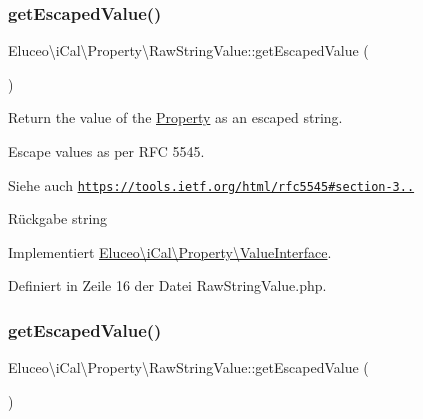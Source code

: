 \subsubsection{\texorpdfstring{get\+Escaped\+Value()}{getEscapedValue()}\hspace{0.1cm}{\footnotesize\ttfamily [2/3]}}
{\footnotesize\ttfamily Eluceo\textbackslash{}i\+Cal\textbackslash{}\+Property\textbackslash{}\+Raw\+String\+Value\+::get\+Escaped\+Value (\begin{DoxyParamCaption}{ }\end{DoxyParamCaption})}

Return the value of the \mbox{\hyperlink{class_eluceo_1_1i_cal_1_1_property}{Property}} as an escaped string.

Escape values as per R\+FC 5545.

\begin{DoxySeeAlso}{Siehe auch}
\href{https://tools.ietf.org/html/rfc5545#section-3.3.11}{\tt https\+://tools.\+ietf.\+org/html/rfc5545\#section-\/3..}
\end{DoxySeeAlso}
\begin{DoxyReturn}{Rückgabe}
string 
\end{DoxyReturn}


Implementiert \mbox{\hyperlink{interface_eluceo_1_1i_cal_1_1_property_1_1_value_interface_a408412ae5d11fd3f239c7985aede8c32}{Eluceo\textbackslash{}i\+Cal\textbackslash{}\+Property\textbackslash{}\+Value\+Interface}}.



Definiert in Zeile 16 der Datei Raw\+String\+Value.\+php.

\mbox{\label{class_eluceo_1_1i_cal_1_1_property_1_1_raw_string_value_a4759366e5ac3a3eb9c4b57704c71b05f}} 
\subsubsection{\texorpdfstring{get\+Escaped\+Value()}{getEscapedValue()}\hspace{0.1cm}{\footnotesize\ttfamily [3/3]}}
{\footnotesize\ttfamily Eluceo\textbackslash{}i\+Cal\textbackslash{}\+Property\textbackslash{}\+Raw\+String\+Value\+::get\+Escaped\+Value (\begin{DoxyParamCaption}{ }\end{DoxyParamCaption})}

